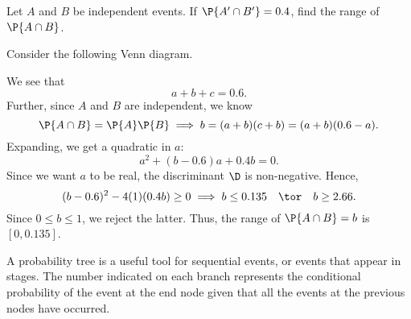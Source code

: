 \begin{sample}
    Let $A$ and $B$ be independent events. If $\P{A' \cap B'} = 0.4$, find the range of $\P{A \cap B}$.
\end{sample}
\begin{sampans}
    Consider the following Venn diagram.
    \begin{figure}[H]
        \centering
        \caption{}
    \end{figure}
    We see that \[a + b + c = 0.6. \tag{$\ast$}\] Further, since $A$ and $B$ are independent, we know \[\P{A \cap B} = \P{A} \P{B} \implies b = (a+b)(c+b) = (a+b)(0.6 - a).\] Expanding, we get a quadratic in $a$: \[a^2 + (b - 0.6)a + 0.4 b = 0.\] Since we want $a$ to be real, the discriminant $\D$ is non-negative. Hence, \[(b-0.6)^2 - 4(1)(0.4b) \geq 0 \implies b \leq 0.135 \quad \tor \quad b \geq 2.66.\] Since $0 \leq b \leq 1$, we reject the latter. Thus, the range of $\P{A \cap B} = b$ is $[0, 0.135]$.
\end{sampans}

\begin{recipe}
    A probability tree is a useful tool for sequential events, or events that appear in stages. The number indicated on each branch represents the conditional probability of the event at the end node given that all the events at the previous nodes have occurred.
\end{recipe}

